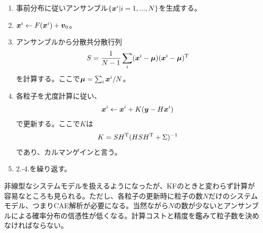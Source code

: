 \documentclass[dvipdfmx, 9pt, a4paper]{jsarticle}
\newcommand{\bm}[1]{{\mbox{\boldmath $#1$}}}
\begin{document}
\begin{tcolorbox}[title=アンサンブルカルマンフィルタ]
\begin{enumerate}
\item 事前分布に従いアンサンブル$\{ \bm x^i | i=1,...,N \}$を生成する。
\item $\bm x^i \leftarrow F(\bm x^i)+\bm v_0$。
\item アンサンブルから分散共分散行列
\begin{equation}
S=\frac{1}{N-1}\sum_i(\bm x^i-\bm \mu)(\bm x^i-\bm \mu)^{\rm T}
\end{equation}
を計算する。ここで$\bm \mu=\sum_i\bm x^i/N$。
\item 各粒子を尤度計算に従い、
\begin{equation}
\bm x^i \leftarrow \bm x^i + K(\bm y-H\bm x^i)
\end{equation}
で更新する。ここで$K$は
\begin{equation}
K=SH^{\rm T}(HSH^{\rm T}+\Sigma)^{-1}
\end{equation}
であり、カルマンゲインと言う。
\item 2.-4.を繰り返す。
\end{enumerate}
\end{tcolorbox}
非線型なシステムモデルを扱えるようになったが、KFのときと変わらず計算が容易なところも見られる。ただし、各粒子の更新時に粒子の数$N$だけのシステムモデル、つまりCAE解析が必要になる。当然ながら$N$の数が少ないとアンサンブルによる確率分布の信憑性が低くなる。計算コストと精度を鑑みて粒子数を決めなければならない。
\end{document}
